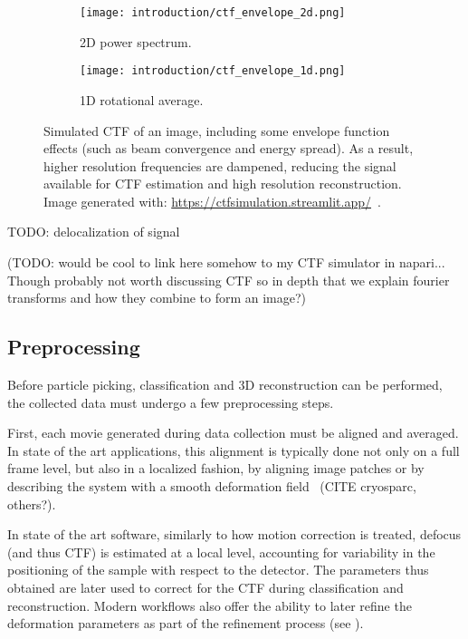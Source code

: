 \begin{figure}[ht]
    \centering
    \begin{subfigure}[B]{.42\textwidth}
        \centering
        \texttt{[image: introduction/ctf\_envelope\_2d.png]}
        \caption{2D power spectrum.}
        \label{fig:ctf_envelope_2d}
    \end{subfigure}%
    \hfill
    \begin{subfigure}[B]{.55\textwidth}
        \centering
        \texttt{[image: introduction/ctf\_envelope\_1d.png]}
        \caption{1D rotational average.}
        \label{fig:ctf_envelope_1d}
    \end{subfigure}%
    \caption[CTF: effect of the envelope function]{Simulated CTF of an image, including some envelope function effects (such as beam convergence and energy spread). As a result, higher resolution frequencies are dampened, reducing the signal available for CTF estimation and high resolution reconstruction. Image generated with: \url{https://ctfsimulation.streamlit.app/}~\cite{jiangWebbasedSimulationContrast2001}.}
    \label{fig:ctf_envelope}
\end{figure}

TODO: delocalization of signal

(TODO: would be cool to link here somehow to my CTF simulator in napari... Though probably not worth discussing CTF so in depth that we explain fourier transforms and how they combine to form an image?)

\subsection{Preprocessing}

Before particle picking, classification and 3D reconstruction can be performed, the collected data must undergo a few preprocessing steps.

First, each movie generated during data collection must be aligned and averaged.
In state of the art applications, this alignment is typically done not only on a full frame level, but also in a localized fashion, by aligning image patches or by describing the system with a smooth deformation field~\cite{zhengMotionCor2AnisotropicCorrection2017} (CITE cryosparc, others?).

In state of the art software, similarly to how motion correction is treated, defocus (and thus CTF) is estimated at a local level, accounting for variability in the positioning of the sample with respect to the detector.
The parameters thus obtained are later used to correct for the CTF during classification and reconstruction.
Modern workflows also offer the ability to later refine the deformation parameters as part of the refinement process (see ).

